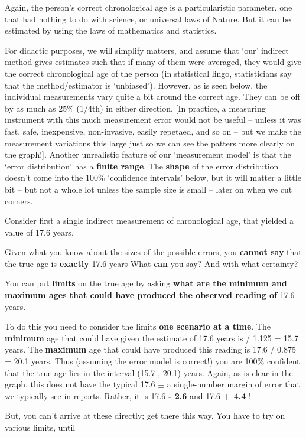 \documentclass[]{book}
\begin{document}
Again, the person's correct chronological age is a particularistic parameter, one that had nothing to do with science, or universal laws of Nature. But it can be estimated by using the laws of mathematics and statistics.

For didactic purposes, we will simplify matters, and assume that `our' indirect method gives estimates such that if many of them were averaged, they would give the correct chronological age of the person (in statistical lingo, statisticians say that the method/estimator is `unbiased'). However, as is seen below, the individual measurements vary quite a bit around the correct age. They can be off by as much as 25\% (1/4th) in either direction. {[}In practice, a measuring instrument with this much measurement error would not be useful -- unless it was fast, safe, inexpensive, non-invasive, easily repetaed, and so on -- but we make the measurement variations this large just so we can see the patters more clearly on the graph!{]}. Another unrealistic feature of our `measurement model' is that the `error distribution' has a \textbf{finite range}. The \textbf{shape} of the error distribution doesn't come into the 100\% `confidence intervals' below, but it will matter a little bit -- but not a whole lot unless the sample size is small -- later on when we cut corners.

Consider first a single indirect measurement of chronological age, that yielded a value of 17.6 years.

Given what you know about the sizes of the possible errors, you \textbf{cannot say} that the true age is \textbf{exactly} 17.6 years What \textbf{can} you say? And with what certainty?

You can put \textbf{limits} on the true age by asking \textbf{what are the minimum and maximum ages that could have produced the observed reading of}
17.6 years.

To do this you need to consider the limits \textbf{one scenario at a time}. The \textbf{minimum} age that could have given the estimate of 17.6 years is /
1.125 =
15.7 years. The \textbf{maximum} age that could have produced this reading is
17.6 / 0.875 = 20.1 years. Thus (assuming the error model is correct!) you are 100\% confident that the true age lies in the interval (15.7 , 20.1) years. Again, as is clear in the graph, this does not have the typical
17.6 \(\pm\) a single-number margin of error that we typically see in reports. Rather, it is 17.6 \textbf{- 2.6} and 17.6 \textbf{+ 4.4} !

But, you can't arrive at these directly; get there this way. You have to try on various limits, until
\end{document}
